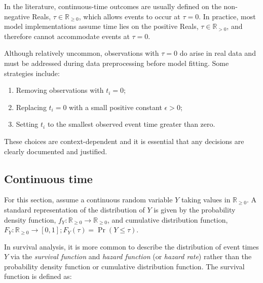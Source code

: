 \documentclass[
  letterpaper,
  krantz2]{style/krantz}
\providecommand{\tightlist}{%
  \setlength{\itemsep}{0pt}\setlength{\parskip}{0pt}}
\begin{document}
\begin{tcolorbox}[enhanced jigsaw, toprule=.15mm, bottomtitle=1mm, opacityback=0, breakable, leftrule=.75mm, title={Handling events at \(\tau = 0\)}, toptitle=1mm, bottomrule=.15mm, colback=white, colframe=quarto-callout-note-color-frame, titlerule=0mm, opacitybacktitle=0.6, coltitle=black, rightrule=.15mm, left=2mm, colbacktitle=quarto-callout-note-color!10!white, arc=.35mm]

In the literature, continuous-time outcomes are usually defined on the
non-negative Reals, \(\tau \in \mathbb{R}_{\geq 0}\), which allows
events to occur at \(\tau = 0\). In practice, most model implementations
assume time lies on the positive Reals, \(\tau \in \mathbb{R}_{>0}\),
and therefore cannot accommodate events at \(\tau = 0\).

Although relatively uncommon, observations with \(\tau = 0\) do arise in
real data and must be addressed during data preprocessing before model
fitting. Some strategies include:

\begin{enumerate}
\def\labelenumi{\arabic{enumi}.}
\tightlist
\item
  Removing observations with \(t_i = 0\);
\item
  Replacing \(t_i = 0\) with a small positive constant \(\epsilon>0\);
\item
  Setting \(t_i\) to the smallest observed event time greater than zero.
\end{enumerate}

These choices are context-dependent and it is essential that any
decisions are clearly documented and justified.

\end{tcolorbox}

\subsection{Continuous time}\label{sec-distributions-continuous}

For this section, assume a continuous random variable \(Y\) taking
values in \(\mathbb{R}_{\geq 0}\). A standard representation of the
distribution of \(Y\) is given by the probability density
function,
\(f_Y: \mathbb{R}_{\geq 0}\rightarrow \mathbb{R}_{\geq 0}\), and
cumulative distribution
function,
\(F_Y: \mathbb{R}_{\geq 0}\rightarrow [0,1]; F_Y(\tau) = \Pr(Y \leq \tau)\).

In survival analysis, it is more common to describe the distribution of
event times \(Y\) via the \emph{survival
function} and \emph{hazard function} (or
\emph{hazard rate}) rather than the probability
density function or cumulative distribution function. The survival
function is defined as:
\end{document}
